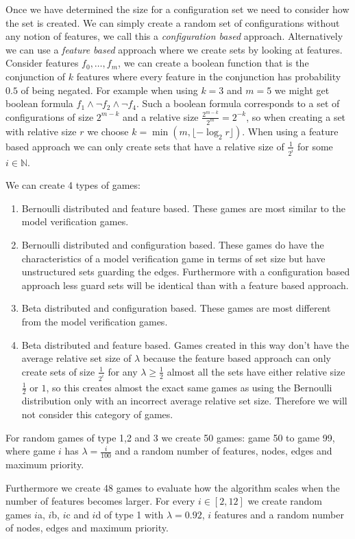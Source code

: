 Once we have determined the size for a configuration set we need to consider how the set is created. We can simply create a random set of configurations without any notion of features, we call this a \textit{configuration based} approach. Alternatively we can use a \textit{feature based} approach where we create sets by looking at features. Consider features $f_0, \dots, f_m$, we can create a boolean function that is the conjunction of $k$ features where every feature in the conjunction has probability $0.5$ of being negated.  For example when using $k=3$ and $m=5$ we might get boolean formula $f_1 \wedge \neg f_2 \wedge \neg f_4$. Such a boolean formula corresponds to a set of configurations of size $2^{m-k}$ and a relative size $\frac{2^{m-k}}{2^m} = 2^{-k}$, so when creating a set with relative size $r$ we choose $k = \min(m, \lfloor -\log_2{r} \rfloor)$. When using a feature based approach we can only create sets that have a relative size of $\frac{1}{2^i}$ for some $i \in \mathbb{N}$.

We can create 4 types of games:
\begin{enumerate}
	\item Bernoulli distributed and feature based. These games are most similar to the model verification games.
	\item Bernoulli distributed and configuration based. These games do have the characteristics of a model verification game in terms of set size but have unstructured sets guarding the edges. Furthermore with a configuration based approach less guard sets will be identical than with a feature based approach.
	\item Beta distributed and configuration based. These games are most different from the model verification games.
	\item Beta distributed and feature based. Games created in this way don't have the average relative set size of $\lambda$ because the feature based approach can only create sets of size $\frac{1}{2^i}$ for any $\lambda \geq \frac{1}{2}$ almost all the sets have either relative size $\frac{1}{2}$ or $1$, so  this creates almost the exact same games as using the Bernoulli distribution only with an incorrect average relative set size. Therefore we will not consider this category of games.
\end{enumerate}
For random games of type 1,2 and 3 we create 50 games: game 50 to game 99, where game $i$ has $\lambda=\frac{i}{100}$ and a random number of features, nodes, edges and maximum priority.

Furthermore we create 48 games to evaluate how the algorithm scales when the number of features becomes larger. For every $i \in [2,12]$ we create random games $i$a, $i$b, $i$c and $i$d of type 1 with $\lambda=0.92$, $i$ features and a random number of nodes, edges and maximum priority.